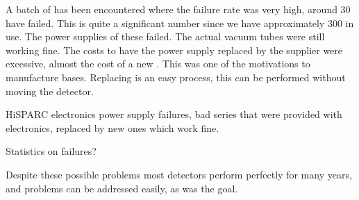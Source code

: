 A batch of \pmts has been encountered where the failure rate was very high, around 30 \pmts have failed. This is quite a significant number since we have approximately 300 \pmts in use. The power supplies of these \pmts failed. The actual vacuum tubes were still working fine. The costs to have the power supply replaced by the supplier were excessive, almost the cost of a new \pmt. This was one of the motivations to manufacture \pmt bases. Replacing \pmts is an easy process, this can be performed without moving the detector.

HiSPARC electronics power supply failures, bad series that were provided with electronics, replaced by new ones which work fine.

Statistics on failures?

Despite these possible problems most detectors perform perfectly for many years, and problems can be addressed easily, as was the goal.
